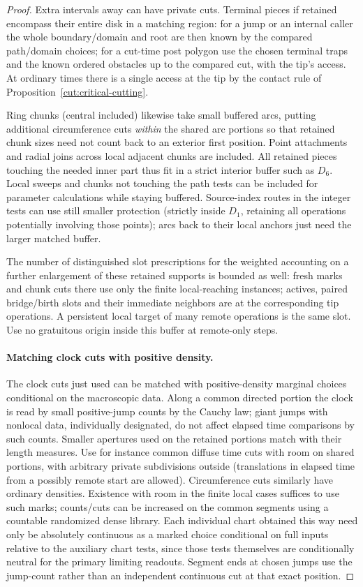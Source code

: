 \begin{proof}
Extra intervals away can have private cuts. Terminal pieces if retained encompass their entire disk in a
matching region: for a jump or an internal caller the whole boundary/domain and root are then known by the
compared path/domain choices; for a cut-time post polygon use the chosen terminal traps and the known
ordered obstacles up to the compared cut, with the tip's access. At ordinary times there is a single access
at the tip by the contact rule of Proposition~\ref{cut:critical-cutting}.

Ring chunks (central included) likewise take small buffered arcs,
putting additional circumference cuts \emph{within} the shared arc portions so that retained chunk sizes
need not count back to an exterior first position. Point attachments and radial joins across local adjacent
chunks are included. All retained pieces touching the needed inner part thus fit in a strict interior buffer
such as \(D_6\). Local sweeps and chunks not touching the path tests can be included for parameter
calculations while staying buffered. Source-index routes in the integer tests can use still smaller
protection (strictly inside \(D_1\), retaining all operations potentially involving those points); arcs back
to their local anchors just need the larger matched buffer.

The number of distinguished slot prescriptions
for the weighted accounting on a further enlargement of these retained supports is bounded as well: fresh
marks and chunk cuts there use only the finite local-reaching instances; actives, paired bridge/birth slots
and their immediate neighbors are at the corresponding tip operations. A persistent local target of many
remote operations is the same slot. Use no gratuitous origin inside this buffer at remote-only steps.

\paragraph{Matching clock cuts with positive density.}

The clock cuts just used can be matched with positive-density marginal choices conditional on the
macroscopic data. Along a common directed portion the clock is read by small positive-jump counts by the
Cauchy law; giant jumps with nonlocal data, individually designated, do not affect elapsed time comparisons
by such counts. Smaller apertures used on the retained portions match with their length measures. Use for
instance common diffuse time cuts with room on shared portions, with arbitrary private subdivisions outside
(translations in elapsed time from a possibly remote start are allowed). Circumference cuts similarly have
ordinary densities. Existence with room in the finite local cases suffices to use such marks; counts/cuts
can be increased on the common segments using a countable randomized dense library. Each individual chart
obtained this way need only be absolutely continuous as a marked choice conditional on full inputs relative
to the auxiliary chart tests, since those tests themselves are conditionally neutral for the primary
limiting readouts. Segment ends at chosen jumps use the jump-count rather than an independent continuous cut
at that exact position.


\end{proof}
